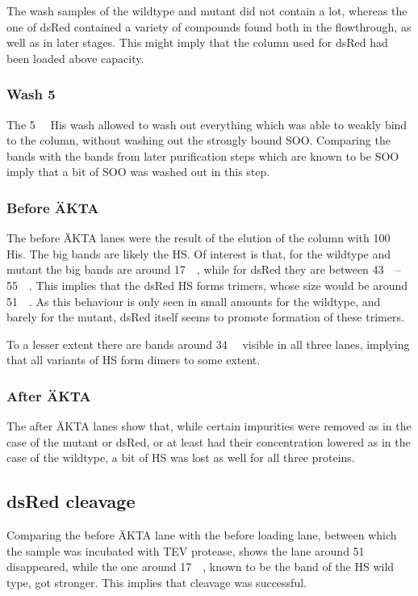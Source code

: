 The wash samples of the wildtype and mutant did not contain a lot, whereas the
one of dsRed contained a variety of compounds found both in the flowthrough, as
well as in later stages. This might imply that the column used for dsRed had
been loaded above capacity.

\subsubsection{Wash \SI{5}{\milli\Molar}}

The \SI{5}{\milli\Molar} His wash allowed to wash out everything which was able
to weakly bind to the column, without washing out the strongly bound SOO.
Comparing the bands with the bands from later purification steps which are
known to be SOO imply that a bit of SOO was washed out in this step.

\subsubsection{Before ÄKTA}

The before ÄKTA lanes were the result of the elution of the column with
\SI{100}{\milli\Molar} His. The big bands are likely the HS. Of interest is
that, for the wildtype and mutant the big bands are around \SI{17}{\kilo\Da},
while for dsRed they are between \SIrange{43}{55}{\kilo\Da}. This implies that
the dsRed HS forms trimers, whose size would be around \SI{51}{\kilo\Da}. As
this behaviour is only seen in small amounts for the wildtype, and barely for
the mutant, dsRed itself seems to promote formation of these trimers.

To a lesser extent there are bands around \SI{34}{\kilo\Da} visible in all
three lanes, implying that all variants of HS form dimers to some extent.

\subsubsection{After ÄKTA}
The after ÄKTA lanes show that, while certain impurities were removed as in the
case of the mutant or dsRed, or at least had their concentration lowered as in
the case of the wildtype, a bit of HS was lost as well for all three proteins.

\subsection{dsRed cleavage}

Comparing the before ÄKTA lane with the before loading lane, between which the
sample was incubated with TEV protease, shows the lane around \SI{51}{\kilo\Da}
disappeared, while the one around \SI{17}{\kilo\Da}, known to be the band of
the HS wild type, got stronger. This implies that cleavage was successful.

